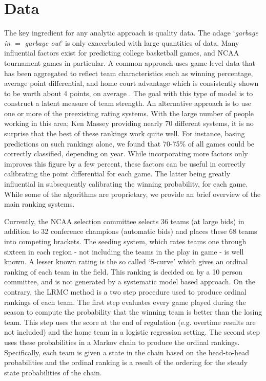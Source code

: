 \documentclass[letterpaper,12pt]{article}
\begin{document}
\section{Data}
The key ingredient for any analytic approach is quality data. The adage `\emph{garbage in $=$ garbage out}' is only exacerbated with large quantities of data. Many influential factors exist for predicting college basketball games, and NCAA tournament games in particular. A common approach uses game level data that has been aggregated to reflect team characteristics such as winning percentage, average point differential, and home court advantage which is consistently shown to be worth about 4 points, on average \citep{harville1994}. The goal with this type of model is to construct a latent measure of team strength. An alternative approach is to use one or more of the preexisting rating systems. With the large number of people working in this area; Ken Massey \citep{kenmassey.com} providing nearly 70 different systems, it is no surprise that the best of these rankings work quite well. For instance, basing predictions on such rankings alone, we found that 70-75\% of all games could be correctly classified, depending on year. While incorporating more factors only improves this figure by a few percent, these factors can be useful in correctly calibrating the point differential for each game. The latter being greatly influential in subsequently calibrating the winning probability, for each game.
While some of the algorithms are proprietary, we provide an brief overview of the main ranking systems.

Currently, the NCAA selection committee selects 36 teams (at large bids) in addition to 32 conference champions (automatic bids) and places these 68 teams into competing brackets. The seeding system, which rates teams one through sixteen in each region - not including the teams in the play in game - is well known. A lesser known rating is the so called `S-curve' which gives an ordinal ranking of each team in the field. This ranking is decided on by a 10 person committee, and is not generated by a systematic model based approach. On the contrary, 
the LRMC method \citep{Kvam2006, mark2010} is a two step procedure used to produce ordinal rankings of each team. The first step evaluates every game played during the season to compute the probability that the winning team is better than the losing team. This step uses the score at the end of regulation (e.g. overtime results are not included) and the home team in a logistic regression setting. The second step uses these probabilities in a Markov chain to produce the ordinal rankings. Specifically, each team is given a state in the chain based on the head-to-head probabilities and the ordinal ranking is a result of the ordering for the steady state probabilities of the chain.
\end{document}
